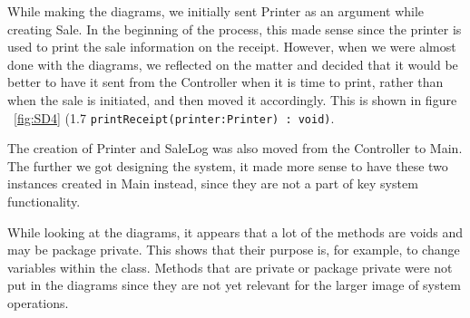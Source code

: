 \documentclass[a4paper]{scrreprt}
\begin{document}
While making the diagrams, we initially sent Printer as an argument while creating Sale.
In the beginning of the process, this made sense since the printer is used to print the sale information on the receipt.
However, when we were almost done with the diagrams,
we reflected on the matter and decided that it would be better to have it sent from the Controller when it is time to print,
rather than when the sale is initiated, and then moved it accordingly.
This is shown in figure ~\ref{fig:SD4} (1.7 \texttt{printReceipt(printer:Printer) : void)}.

The creation of Printer and SaleLog was also moved from the Controller to Main.
The further we got designing the system,
it made more sense to have these two instances created in Main instead,
since they are not a part of key system functionality.

While looking at the diagrams, it appears that a lot of the methods are voids and may be package private.
This shows that their purpose is, for example, to change variables within the class.
Methods that are private or package private were not put in the diagrams since they are not yet relevant
for the larger image of system operations.
\end{document}
